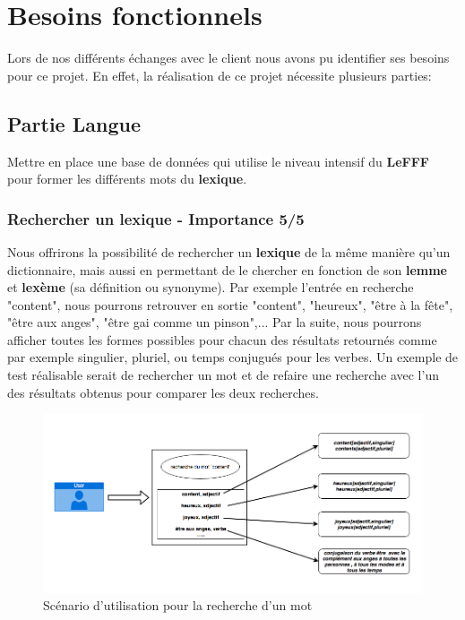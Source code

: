 \section{Besoins fonctionnels}
Lors de nos différents échanges avec le client nous avons pu identifier ses besoins pour ce projet. En effet, la réalisation de ce projet nécessite plusieurs parties:

\subsection{Partie Langue}
Mettre en place une base de données qui utilise le niveau intensif du \textbf{LeFFF} pour former les différents mots du \textbf{lexique}.

\subsubsection{Rechercher un lexique - Importance 5/5}

{Nous offrirons la possibilité de rechercher un \textbf{lexique} de la même manière qu'un dictionnaire, mais aussi en permettant de le chercher en fonction de son \textbf{lemme} et \textbf{lexème} (sa définition ou synonyme). Par exemple l'entrée en recherche "content", nous pourrons retrouver en sortie "content", "heureux", "être à la fête", "être aux anges", "être gai comme un pinson",... Par la suite, nous pourrons afficher toutes les formes possibles pour chacun des résultats retournés comme par exemple singulier, pluriel, ou temps conjugués pour les verbes. Un exemple de test réalisable serait de rechercher un mot et de refaire une recherche avec l'un des résultats obtenus pour comparer les deux recherches.\par}

\begin{figure}[ht]
    \centering
    \includegraphics[scale=0.5]{exemple.png}
    \caption{Scénario d'utilisation pour la recherche d'un mot }
\end{figure}
\newpage

